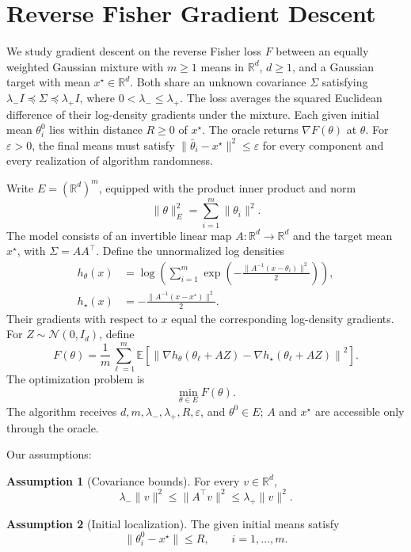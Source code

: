 \documentclass[10pt]{article}
\theoremstyle{definition}
\newtheorem{assumption}{Assumption}
\begin{document}
\section*{Reverse Fisher Gradient Descent}
We study gradient descent on the reverse Fisher loss $F$ between an equally weighted Gaussian mixture with $m\geq1$ means in $\mathbb{R}^d$, $d\geq1$, and a Gaussian target with mean $x^\star\in\mathbb{R}^d$. Both share an unknown covariance $\Sigma$ satisfying $\lambda_-I\preceq\Sigma\preceq\lambda_+I$, where $0<\lambda_-\leq\lambda_+$. The loss averages the squared Euclidean difference of their log-density gradients under the mixture. Each given initial mean $\theta_i^0$ lies within distance $R\geq0$ of $x^\star$. The oracle returns $\nabla F(\theta)$ at $\theta$. For $\varepsilon>0$, the final means must satisfy $\|\bar\theta_i-x^\star\|^2\leq\varepsilon$ for every component and every realization of algorithm randomness.

Write $E=(\mathbb{R}^d)^m$, equipped with the product inner product and norm
\[
\|\theta\|_E^2=\sum_{i=1}^m\|\theta_i\|^2.
\]
The model consists of an invertible linear map $A:\mathbb{R}^d\to\mathbb{R}^d$ and the target mean $x^\star$, with $\Sigma=AA^\top$. Define the unnormalized log densities
\[
\begin{aligned}
h_\theta(x)&=\log\left(\sum_{i=1}^m
 \exp\left(-\frac{\|A^{-1}(x-\theta_i)\|^2}{2}\right)\right),\\
h_\star(x)&=-\frac{\|A^{-1}(x-x^\star)\|^2}{2}.
\end{aligned}
\]
Their gradients with respect to $x$ equal the corresponding log-density gradients. For $Z\sim\mathcal{N}(0,I_d)$, define
\[
F(\theta)=\frac{1}{m}\sum_{\ell=1}^m
\mathbb{E}\left[
\left\|\nabla h_\theta(\theta_\ell+AZ)
-\nabla h_\star(\theta_\ell+AZ)\right\|^2
\right].
\]
The optimization problem is
\[
\min_{\theta\in E}F(\theta).
\]
The algorithm receives $d,m,\lambda_-,\lambda_+,R,\varepsilon$, and $\theta^0\in E$; $A$ and $x^\star$ are accessible only through the oracle.

Our assumptions:
\begin{assumption}[Covariance bounds]
For every $v\in\mathbb{R}^d$,
\[
\lambda_-\|v\|^2\leq\|A^\top v\|^2
\leq\lambda_+\|v\|^2.
\]
\end{assumption}

\begin{assumption}[Initial localization]
The given initial means satisfy
\[
\|\theta_i^0-x^\star\|\leq R,
\qquad i=1,\ldots,m.
\]
\end{assumption}
\end{document}
